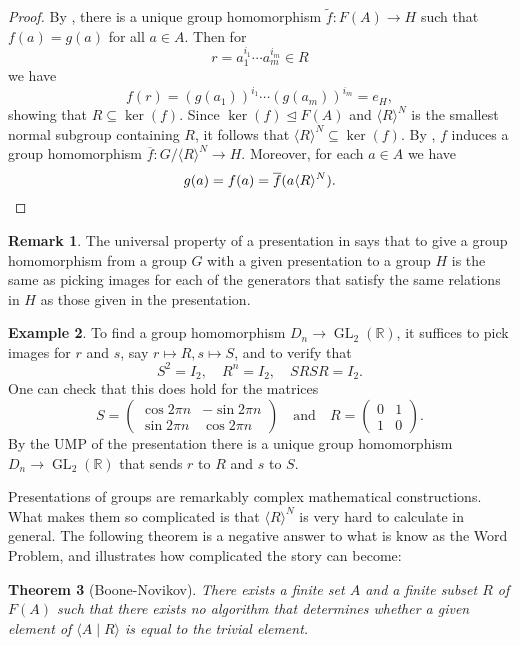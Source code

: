 \documentclass[12pt]{report}
\newtheorem{theorem}{Theorem}[chapter]
\numberwithin{equation}{section}
\numberwithin{theorem}{chapter}
\theoremstyle{definition}
\newtheorem{example}[theorem]{Example}
\newtheorem*{basic properties}{Basic Properties}
\newtheorem*{Important Remark}{Important Remark}
\newtheorem{remark}[theorem]{Remark}
\DeclareMathOperator{\GL}{GL}
\renewcommand{\ker}{\operatorname{ker}}
\begin{document}
\begin{proof}
By , there is a unique group homomorphism $\tilde f:F(A)\to H$ such that $f(a)=g(a)$ for all $a\in A$. Then for 
$$r = a_1^{i_1} \cdots a_m^{i_m} \in R$$ 
we have 
$$f(r)=(g(a_1))^{i_1} \cdots (g(a_m))^{i_m} = e_H,$$ 
showing that $R\subseteq \ker(f)$. Since $\ker(f)\trianglelefteq F(A)$ and $\langle R\rangle ^N$ is the smallest normal subgroup containing $R$, it follows that $\langle R\rangle^N\subseteq \ker(f)$. By , $f$ induces a group homomorphism $\overline{f}: G/\langle R\rangle ^N\to H$. Moreover, for each $a\in A$ we have 
$$g(a)=f(a)=\overline f(a\langle R\rangle ^N).\qedhere$$
\end{proof}

\begin{remark}
The universal property of a presentation in  says that to give a group homomorphism from a group $G$ with a given presentation to a group $H$ is the same as picking images for each of the generators that satisfy the same relations in $H$ as those given in the presentation.
\end{remark}

\begin{example}
To find a group homomorphism $D_{n} \to \GL_2(\mathbb{R})$, it suffices to pick images for $r$ and $s$, say $r\mapsto R, s\mapsto S$, and to verify that 
$$S^2=I_2, \quad R^n=I_2, \quad SRSR=I_2.$$ 
One can check that this does hold for the matrices
$$S=\begin{pmatrix} \cos{2\pi}{n} & -\sin{2\pi}{n} \\ \sin{2\pi}{n} & \cos{2\pi}{n}\end{pmatrix} \quad \textrm{and} \quad R=\begin{pmatrix}  0 & 1 \\ 1& 0\end{pmatrix}.$$
By the UMP of the presentation there is a unique group homomorphism $D_{n} \to \GL_2(\mathbb{R})$ that sends $r$ to $R$ and $s$ to $S$.
\end{example}


Presentations of groups are remarkably complex mathematical constructions. What makes them so complicated is that $\langle R \rangle^N$ is very hard to calculate in general. The following theorem is a negative answer to what is know as the Word Problem, and illustrates how complicated the story can become:

\begin{theorem}[Boone-Novikov]
There exists a finite set $A$ and a finite subset $R$ of $F(A)$ such that there exists no algorithm that determines whether a given element of $\langle A \mid R \rangle$ is equal to the trivial element.	
\end{theorem}
\end{document}
